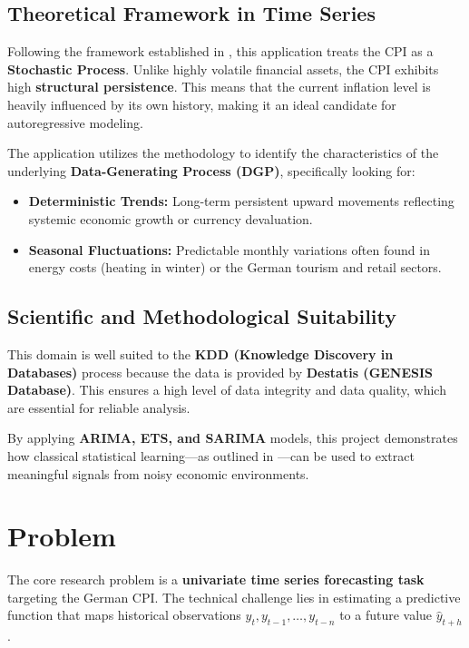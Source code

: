 \subsection{Theoretical Framework in Time Series}

Following the framework established in \cite{Hyndman2021}, this application treats the CPI as a \textbf{Stochastic Process}. Unlike highly volatile financial assets, the CPI exhibits high \textbf{structural persistence}. This means that the current inflation level is heavily influenced by its own history, making it an ideal candidate for autoregressive modeling.

The application utilizes the \cite{Box2015} methodology to identify the characteristics of the underlying \textbf{Data-Generating Process (DGP)}, specifically looking for:
\begin{itemize}
	\item \textbf{Deterministic Trends:} Long-term persistent upward movements reflecting systemic economic growth or currency devaluation.
	\item \textbf{Seasonal Fluctuations:} Predictable monthly variations often found in energy costs (heating in winter) or the German tourism and retail sectors.
\end{itemize}

\subsection{Scientific and Methodological Suitability}

This domain is well suited to the \textbf{KDD (Knowledge Discovery in Databases)} process because the data is provided by \textbf{Destatis (GENESIS Database)}. This ensures a high level of data integrity and data quality, which are essential for reliable analysis.

By applying \textbf{ARIMA, ETS, and SARIMA} models, this project demonstrates how classical statistical learning—as outlined in \cite{Hastie2009}—can be used to extract meaningful signals from noisy economic environments.

\section{Problem}

The core research problem is a \textbf{univariate time series forecasting task} targeting the German CPI. The technical challenge lies in estimating a predictive function that maps historical observations $y_{t}, y_{t-1}, \dots, y_{t-n}$ to a future value $\hat{y}_{t+h}$. 

